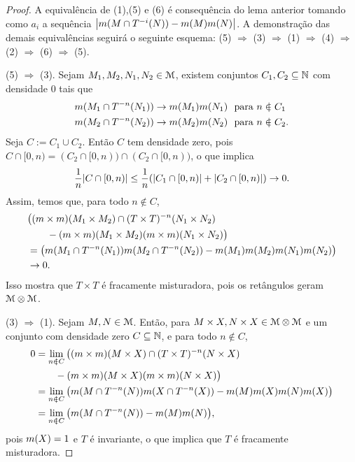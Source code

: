 \begin{proof}
	A equivalência de (1),(5) e (6) é consequência do lema anterior tomando como $a_i$ a sequência $\left|m(M \cap T^{-i}(N)) - m(M)m(N)\right|$.
	A demonstração das demais equivalências seguirá o seguinte esquema: (5) $\Rightarrow$ (3) $\Rightarrow$ (1) $\Rightarrow$ (4) $\Rightarrow$ (2) $\Rightarrow$ (6) $\Rightarrow$ (5).

	 (5) $\Rightarrow$ (3). Sejam $M_1,M_2,N_1,N_2 \in \mathcal{M}$, existem conjuntos $C_1,C_2 \subseteq \mathbb{N}$ com densidade $0$ tais que
	 \begin{align*}
	 \med(M_1 \cap T^{-n}(N_1)) &\conv \med(M_1)\med(N_1) \text{\ \ para $n \notin C_1$} \\
	 \med(M_2 \cap T^{-n}(N_2)) &\conv \med(M_2)\med(N_2) \text{\ \ para $n \notin C_2$}. \\
	 \end{align*}
	Seja $C := C_1 \cup C_2$. Então $C$ tem densidade zero, pois $C \cap [0,n) = (C_2 \cap [0,n)) \cap (C_2 \cap [0,n))$, o que implica
	\begin{equation*}
	\frac{1}{n} |C \cap [0,n)| \leq \frac{1}{n}(|C_1 \cap [0,n)|+|C_2 \cap [0,n)|) \rightarrow 0.
	\end{equation*}
Assim, temos que, para todo $n \notin C$,
	\begin{align*}
	&\big((m\times m)(M_1 \times M_2) \cap (T \times T)^{-n}(N_1 \times N_2) \\
		&\qquad- (m\times m)(M_1 \times M_2)(m\times m)(N_1\times N_2) \big) \\
		&=\big(m(M_1 \cap T^{-n}(N_1))m(M_2 \cap T^{-n}(N_2))-m(M_1)m(M_2)m(N_1)m(N_2) \big) \\
		&\rightarrow 0.
	\end{align*}
Isso mostra que $T \times T$ é fracamente misturadora, pois os retângulos geram $\mathcal{M} \otimes \mathcal{M}$.

(3) $\Rightarrow$ (1). Sejam $M,N \in \mathcal{M}$. Então, para $M \times X,N\times X \in \mathcal{M} \otimes \mathcal{M}$ e um conjunto com densidade zero $C \subseteq \mathbb{N}$, e para todo $n \notin C$,
	\begin{align*}
	0 &=\lim_{n \notin C} \big((\med\times\med)(M \times X) \cap (T \times T)^{-n}(N \times X) \\
		&\qquad- (\med\times\med)(M \times X)(\med\times\med)(N\times X) \big) \\
		&=\lim_{n \notin C} \big(\med(M \cap T^{-n}(N))\med(X \cap T^{-n}(X))-\med(M)\med(X)\med(N)\med(X) \big) \\
		&= \lim_{n \notin C} \big(\med(M \cap T^{-n}(N)) - \med(M)\med(N) \big),
	\end{align*}
pois $m(X)=1$ e $T$ é invariante, o que implica que $T$ é fracamente misturadora.


\end{proof}
